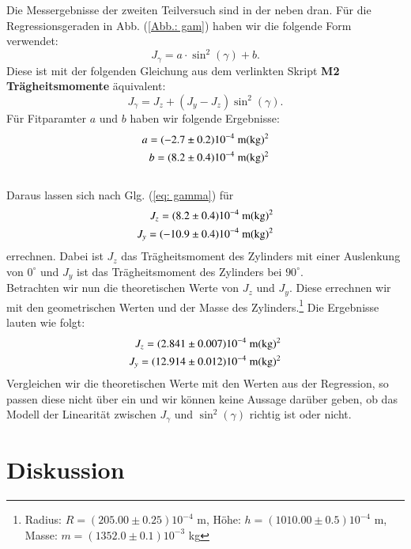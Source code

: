 \documentclass[bibliography=totocnumbered]{scrartcl}
\begin{document}
    Die Messergebnisse der zweiten Teilversuch sind in der neben dran. 
    Für die Regressionsgeraden in Abb. (\ref{Abb.: gam}) haben wir die folgende Form verwendet:
    \begin{equation}\label{eq: allg_Reg.gerade}
    	J_{\gamma}=a\cdot \sin^{2}(\gamma)+b.
    \end{equation}
	Diese ist mit der folgenden Gleichung aus dem verlinkten Skript \textbf{M2 Trägheitsmomente} äquivalent:
	\begin{equation}\label{eq: gamma}
		J_{\gamma}=J_{z}+(J_{y}-J_{z})\sin^{2}(\gamma).
	\end{equation}
	Für Fitparamter $ a $ und $ b $ haben wir folgende Ergebnisse:
	\begin{align}
		a=(-2.7\pm0.2)10^{-4} \text{ m(kg)$ ^{2} $}\\
		b=(8.2\pm0.4)10^{-4} \text{ m(kg)$ ^{2} $}
	\end{align}
\\
Daraus lassen sich nach Glg. (\ref{eq: gamma}) für 
\begin{align}
	J_{z}=(8.2\pm0.4)10^{-4} \text{ m(kg)$ ^{2} $}\\
	J_{y}=(-10.9\pm0.4)10^{-4} \text{ m(kg)$ ^{2} $}
\end{align}
errechnen. Dabei ist $ J_{z} $ das Trägheitsmoment des Zylinders mit einer Auslenkung von $ 0^{\circ} $ und $ J_{y} $ ist das Trägheitsmoment des Zylinders bei $ 90^{\circ} $. \\
Betrachten wir nun die theoretischen Werte von $ J_{z} $ und $ J_{y} $. Diese errechnen wir mit den geometrischen Werten und der Masse des Zylinders.\footnote{Radius: $ R=(205.00\pm0.25)10^{-4} $ m, Höhe: $ h=(1010.00\pm 0.5)10^{-4} $ m, Masse: $ m=(1352.0\pm 0.1)10^{-3} $ kg} Die Ergebnisse lauten wie folgt:
\begin{align}
	J_{z}=(2.841\pm 0.007)10^{-4} \text{ m(kg)$ ^{2} $}\\
	J_{y}=(12.914\pm 0.012)10^{-4}\text{ m(kg)$ ^{2} $}
\end{align}
Vergleichen wir die theoretischen Werte mit den Werten aus der Regression, so passen diese nicht über ein und wir können keine Aussage darüber geben, ob das Modell der Linearität zwischen $ J_{\gamma} $ und $ \sin^{2}(\gamma) $ richtig ist oder nicht.
	
\newpage
	\section{Diskussion}
\end{document}
